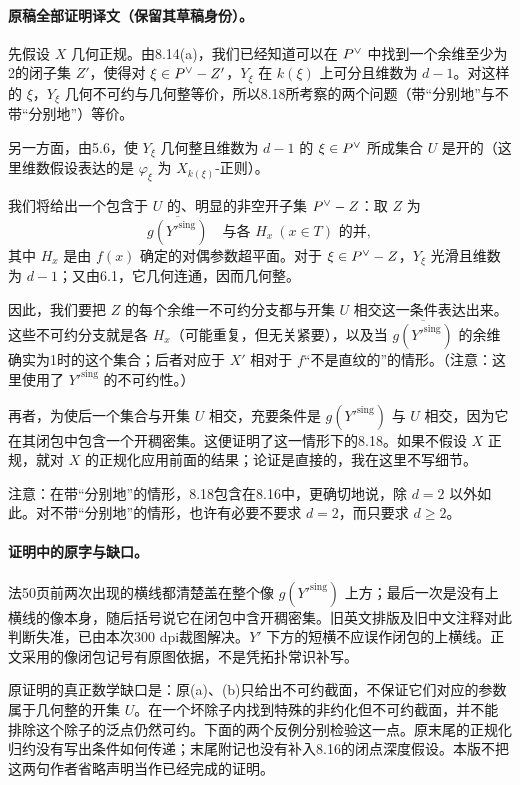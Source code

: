 \paragraph{原稿全部证明译文（保留其草稿身份）。}
先假设 $X$ 几何正规。由8.14(a)，我们已经知道可以在 $P^\vee$ 中找到一个余维至少为2的闭子集 $Z'$，使得对 $\xi\in P^\vee-Z'$，$Y_\xi$ 在 $k(\xi)$ 上可分且维数为 $d-1$。对这样的 $\xi$，$Y_\xi$ 几何不可约与几何整等价，所以8.18所考察的两个问题（带“分别地”与不带“分别地”）等价。

另一方面，由5.6，使 $Y_\xi$ 几何整且维数为 $d-1$ 的 $\xi\in P^\vee$ 所成集合 $U$ 是开的（这里维数假设表达的是 $\varphi_\xi$ 为 $X_{k(\xi)}$-正则）。

我们将给出一个包含于 $U$ 的、明显的非空开子集 $P^\vee-Z$：取 $Z$ 为
\[
 \overline{g(Y'^{\mathrm{sing}})}
 \quad\text{与各 }H_x\ (x\in T)\text{ 的并},
\]
其中 $H_x$ 是由 $f(x)$ 确定的对偶参数超平面。对于 $\xi\in P^\vee-Z$，$Y_\xi$ 光滑且维数为 $d-1$；又由6.1，它几何连通，因而几何整。

因此，我们要把 $Z$ 的每个余维一不可约分支都与开集 $U$ 相交这一条件表达出来。这些不可约分支就是各 $H_x$（可能重复，但无关紧要），以及当 $\overline{g(Y'^{\mathrm{sing}})}$ 的余维确实为1时的这个集合；后者对应于 $X'$ 相对于 $f$“不是直纹的”的情形。（注意：这里使用了 $Y'^{\mathrm{sing}}$ 的不可约性。）

再者，为使后一个集合与开集 $U$ 相交，充要条件是 $g(Y'^{\mathrm{sing}})$ 与 $U$ 相交，因为它在其闭包中包含一个开稠密集。这便证明了这一情形下的8.18。如果不假设 $X$ 正规，就对 $X$ 的正规化应用前面的结果；论证是直接的，我在这里不写细节。

注意：在带“分别地”的情形，8.18包含在8.16中，更确切地说，除 $d=2$ 以外如此。对不带“分别地”的情形，也许有必要不要求 $d=2$，而只要求 $d\ge2$。

\paragraph{证明中的原字与缺口。}
法50页前两次出现的横线都清楚盖在整个像 $g(Y'^{\mathrm{sing}})$ 上方；最后一次是没有上横线的像本身，随后括号说它在闭包中含开稠密集。旧英文排版及旧中文注释对此判断失准，已由本次300 dpi裁图解决。$Y'$ 下方的短横不应误作闭包的上横线。正文采用的像闭包记号有原图依据，不是凭拓扑常识补写。

原证明的真正数学缺口是：原(a)、(b)只给出不可约截面，不保证它们对应的参数属于几何整的开集 $U$。在一个坏除子内找到特殊的非约化但不可约截面，并不能排除这个除子的泛点仍然可约。下面的两个反例分别检验这一点。原末尾的正规化归约没有写出条件如何传递；末尾附记也没有补入8.16的闭点深度假设。本版不把这两句作者省略声明当作已经完成的证明。

